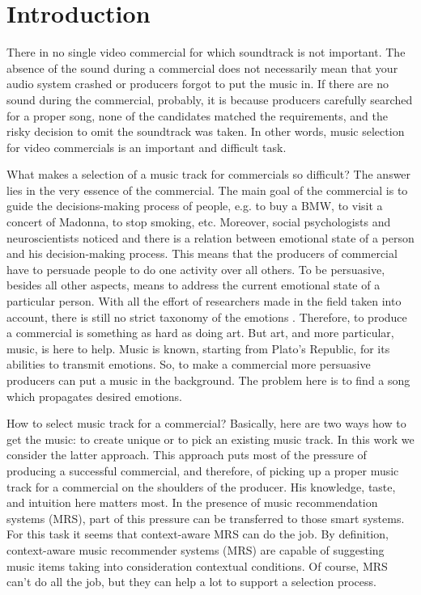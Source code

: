\documentclass{llncs}
\begin{document}
\section{Introduction}
\label{introduction}

There in no single video commercial for which soundtrack is not important. The absence of the sound during a commercial does not necessarily mean that your audio system crashed or producers forgot to put the music in. If there are no sound during the commercial, probably, it is because producers carefully searched for a proper song, none of the candidates matched the requirements, and the risky decision to omit the soundtrack was taken. In other words, music selection for video commercials is an important and difficult task.

What makes a selection of a music track for commercials so difficult? The answer lies in the very essence of the commercial. The main goal of the commercial is to guide the decisions-making process of people\cite{reynolds2001understanding}, e.g. to buy a BMW, to visit a concert of Madonna, to stop smoking, etc. Moreover, social psychologists and neuroscientists noticed and there is a relation between emotional state of a person and his decision-making process\cite{schwarz2000emotion, bechara2004role}. This means that the producers of commercial have to persuade people to do one activity over all others. To be persuasive, besides all other aspects, means to address the current emotional state of a particular person. With all the effort of researchers made in the field taken into account, there is still no strict taxonomy of the emotions \cite{cowie2001emotion}. Therefore, to produce a commercial is something as hard as doing art. But art, and more particular, music, is here to help. Music is known, starting from Plato's Republic, for its abilities to transmit emotions. So, to make a commercial more persuasive producers can put a music in the background. The problem here is to find a song which propagates desired emotions.

How to select music track for a commercial? Basically, here are two ways how to get the music: to create unique or to pick an existing music track. In this work we consider the latter approach. This approach puts most of the pressure of producing a successful commercial, and therefore, of picking up a proper music track for a commercial on the shoulders of the producer. His knowledge, taste, and intuition here matters most. In the presence of music recommendation systems (MRS)\cite{typke2005survey}, part of this pressure can be transferred to those smart systems. For this task it seems that context-aware MRS can do the job. By definition, context-aware music recommender systems (MRS) are capable of suggesting music items taking into consideration contextual conditions\cite{adomavicius2011context}. Of course, MRS can't do all the job, but they can help a lot to support a selection process.
\end{document}
